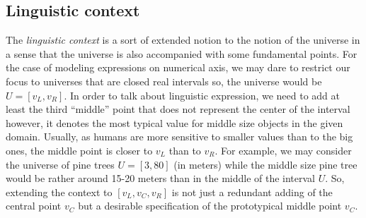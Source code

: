 \documentclass[review]{elsarticle}
\begin{document}
\subsection{Linguistic context}
\label{sec:context}

The \emph{linguistic context} is a sort of extended notion to the notion of the universe in a sense that the universe is also accompanied with some fundamental points. For the case of modeling expressions on numerical axis, we may dare to restrict our focus to universes that are closed real intervals so, the universe would be $U = [v_L, v_R]$. In order to talk about linguistic expression, we need to add at least the third ``middle'' point that does not represent the center of the interval however, it denotes the most typical value for middle size objects in the given domain. Usually, as humans are more sensitive to smaller values than to the big ones, the middle point is closer to $v_L$ than to $v_R$. For example, we may consider the universe of pine trees $U=[3,80]$ (in meters) while the middle size pine tree would be rather around 15-20 meters than in the middle of the interval $U$. So, extending the context to $[v_L, v_C, v_R]$ is not just a redundant adding of the central point $v_C$ but a desirable specification of the prototypical middle point $v_C$. 
\end{document}
